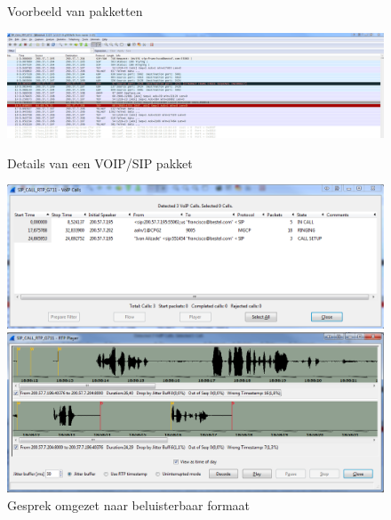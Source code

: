 \documentclass[pdftex,a4paper,12pt,twoside]{report}
\begin{document}
\begin{figure}[H]
\caption{Voorbeeld van pakketten}
\includegraphics[scale=0.3]{img/sniffer1}
\caption{Details van een VOIP/SIP pakket}
\includegraphics[scale=0.5]{img/sniffer2}
\caption{Gesprek omgezet naar beluisterbaar formaat}
\includegraphics[scale=0.5]{img/sniffer3}
\end{figure}
\newpage
\end{document}

